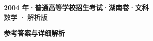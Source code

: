 \documentclass[zihao=-4, a4paper]{ctexart}
\begin{document}
\begin{center}
  {\Large\bfseries 2004 年·普通高等学校招生考试·湖南卷·文科}\\[4pt]
  {\large 数学 · 解析版}
\end{center}
\medskip
{}

\clearpage
{}
\begin{center}{\Large\bfseries 参考答案与详细解析}\end{center}
\medskip

\end{document}
